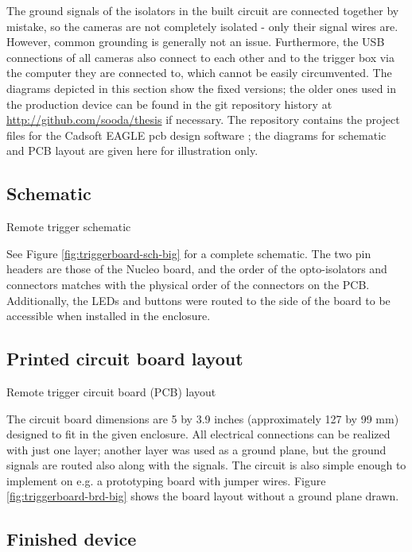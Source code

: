 The ground signals of the isolators in the built circuit are connected together by mistake, so the cameras are not completely isolated - only their signal wires are.
However, common grounding is generally not an issue.
Furthermore, the USB connections of all cameras also connect to each other and to the trigger box via the computer they are connected to, which cannot be easily circumvented.
The diagrams depicted in this section show the fixed versions; the older ones used in the production device can be found in the git repository history at \url {http://github.com/sooda/thesis} if necessary.
The repository contains the project files for the Cadsoft EAGLE pcb design software \cite{eaglepcb}; the diagrams for schematic and PCB layout are given here for illustration only.

\subsection{Schematic} \label{app:fullschematic}

{Remote trigger schematic}

See Figure \ref{fig:triggerboard-sch-big} for a complete schematic.
The two pin headers are those of the Nucleo board, and the order of the opto-isolators and connectors matches with the physical order of the connectors on the PCB.
Additionally, the LEDs and buttons were routed to the side of the board to be accessible when installed in the enclosure.

\subsection{Printed circuit board layout}

{Remote trigger circuit board (PCB) layout}

The circuit board dimensions are 5 by 3.9 inches (approximately 127 by 99 mm) designed to fit in the given enclosure.
All electrical connections can be realized with just one layer;
another layer was used as a ground plane, but the ground signals are routed also along with the signals.
The circuit is also simple enough to implement on e.g. a prototyping board with jumper wires.
Figure \ref{fig:triggerboard-brd-big} shows the board layout without a ground plane drawn.

\subsection{Finished device}

